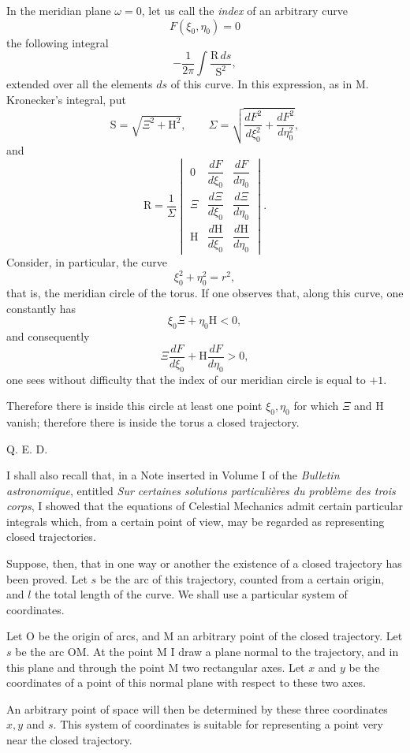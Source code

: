\documentclass[11pt]{article}
\begin{document}
In the meridian plane $\omega=0$, let us call the \emph{index} of an arbitrary curve
\[
F(\xi_0,\eta_0)=0
\]
the following integral
\[
-\frac1{2\pi}\int \frac{\mathrm{R}\,ds}{\mathrm{S}^2},
\]
extended over all the elements $ds$ of this curve. In this expression, as in M. Kronecker’s integral, put
\[
\mathrm{S}=\sqrt{\Xi^2+\mathrm{H}^2},
\qquad
\Sigma=\sqrt{\frac{dF^2}{d\xi_0^2}+\frac{dF^2}{d\eta_0^2}},
\]
and
\[
\mathrm{R}=\frac1{\Sigma}
\begin{vmatrix}
0&\dfrac{dF}{d\xi_0}&\dfrac{dF}{d\eta_0}\\[0.6em]
\Xi&\dfrac{d\Xi}{d\xi_0}&\dfrac{d\Xi}{d\eta_0}\\[0.6em]
\mathrm{H}&\dfrac{d\mathrm{H}}{d\xi_0}&\dfrac{d\mathrm{H}}{d\eta_0}
\end{vmatrix}.
\]
Consider, in particular, the curve
\[
\xi_0^2+\eta_0^2=r^2,
\]
that is, the meridian circle of the torus. If one observes that, along this curve, one constantly has
\[
\xi_0\Xi+\eta_0\mathrm{H}<0,
\]
and consequently
\[
\Xi\frac{dF}{d\xi_0}+\mathrm{H}\frac{dF}{d\eta_0}>0,
\]
one sees without difficulty that the index of our meridian circle is equal to $+1$.

Therefore there is inside this circle at least one point $\xi_0,\eta_0$ for which $\Xi$ and $\mathrm{H}$ vanish; therefore there is inside the torus a closed trajectory.
\begin{flushright}Q. E. D.\end{flushright}

I shall also recall that, in a Note inserted in Volume I of the \emph{Bulletin astronomique}, entitled \emph{Sur certaines solutions particulières du problème des trois corps}, I showed that the equations of Celestial Mechanics admit certain particular integrals which, from a certain point of view, may be regarded as representing closed trajectories.

Suppose, then, that in one way or another the existence of a closed trajectory has been proved. Let $s$ be the arc of this trajectory, counted from a certain origin, and $l$ the total length of the curve. We shall use a particular system of coordinates.

Let O be the origin of arcs, and M an arbitrary point of the closed trajectory. Let $s$ be the arc OM. At the point M I draw a plane normal to the trajectory, and in this plane and through the point M two rectangular axes. Let $x$ and $y$ be the coordinates of a point of this normal plane with respect to these two axes.

An arbitrary point of space will then be determined by these three coordinates $x,y$ and $s$. This system of coordinates is suitable for representing a point very near the closed trajectory.
\end{document}
